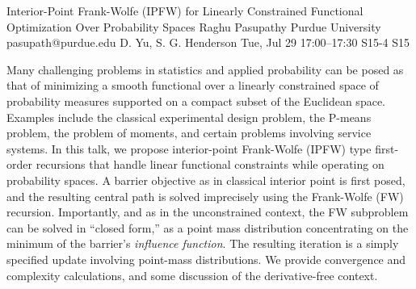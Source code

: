 \documentclass[12pt,lettersize,oneside]{book} %
\begin{document}
\begin{talk}
  {Interior-Point Frank-Wolfe (IPFW) for Linearly Constrained Functional Optimization Over Probability Spaces}%
  {Raghu Pasupathy}%
  {Purdue University}%
  {pasupath@purdue.edu}%
  {D. Yu, S. G. Henderson}%
  {}%
  {Tue, Jul 29 17:00--17:30}%
  {S15-4}%
  {S15}%
  
    
   
Many challenging problems in statistics and applied probability can be posed as that of minimizing a smooth functional over a linearly constrained space of probability measures supported on a compact subset of the Euclidean space. Examples include the classical experimental design problem, the P-means problem, the problem of moments, and certain problems involving service systems.  In this talk, we propose interior-point Frank-Wolfe (IPFW) type first-order recursions that handle linear functional constraints while operating on probability spaces. A barrier objective as in classical interior point is first posed, and the resulting central path is solved imprecisely using the Frank-Wolfe (FW) recursion. Importantly, and as in the unconstrained context, the FW subproblem can be solved in ``closed form,'' as a point mass distribution concentrating on the minimum of the barrier's \emph{influence function}. The resulting iteration is a simply specified update involving point-mass distributions. We provide convergence and complexity calculations, and some discussion of the derivative-free context. 

\medskip




\end{talk}
\end{document}
